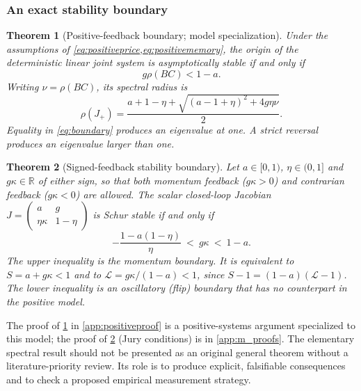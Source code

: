 \documentclass[10pt,twocolumn,letterpaper]{article}
\newtheorem{theorem}{Theorem}[section]
\theoremstyle{definition}
\theoremstyle{remark}
\newcommand{\R}{\mathbb{R}}
\begin{document}
\subsubsection{An exact stability boundary}
\begin{theorem}[Positive-feedback boundary; model specialization]
\label{thm:positive}
Under the assumptions of \cref{eq:positiveprice,eq:positivememory}, the origin of the deterministic linear joint system is asymptotically stable if and only if
\begin{equation}
 g\rho(BC)<1-a.
 \label{eq:boundary}
\end{equation}
Writing $\nu=\rho(BC)$, its spectral radius is
\begin{equation}
 \rho(J_+)=\frac{a+1-\eta+
 \sqrt{(a-1+\eta)^2+4g\eta\nu}}{2}.
 \label{eq:networkradius}
\end{equation}
Equality in \cref{eq:boundary} produces an eigenvalue at one. A strict reversal produces an eigenvalue larger than one.
\end{theorem}

\begin{theorem}[Signed-feedback stability boundary]
\label{thm:signed_stability}
Let $a\in[0,1)$, $\eta\in(0,1]$ and $g\kappa\in\R$ of either sign, so that both momentum feedback ($g\kappa>0$) and contrarian feedback ($g\kappa<0$) are allowed. The scalar closed-loop Jacobian $J = \left(\begin{smallmatrix} a & g \\ \eta\kappa & 1-\eta \end{smallmatrix}\right)$ is Schur stable if and only if
\begin{equation}
 -\frac{1 - a(1-\eta)}{\eta}\ <\ g\kappa\ <\ 1-a .
 \label{eq:signed_boundary}
\end{equation}
The upper inequality is the momentum boundary. It is equivalent to $S=a+g\kappa<1$ and to $\mathcal L=g\kappa/(1-a)<1$, since $S-1=(1-a)(\mathcal L-1)$. The lower inequality is an oscillatory (flip) boundary that has no counterpart in the positive model.
\end{theorem}
The proof of \cref{thm:positive} in \cref{app:positiveproof} is a positive-systems argument specialized to this model; the proof of \cref{thm:signed_stability} (Jury conditions) is in \cref{app:m_proofs}. The elementary spectral result should not be presented as an original general theorem without a literature-priority review. Its role is to produce explicit, falsifiable consequences and to check a proposed empirical measurement strategy.
\end{document}
